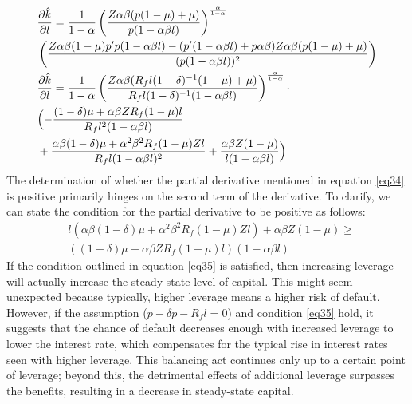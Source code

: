 \documentclass[12pt]{report}
\begin{document}
\begin{align}
    &\frac{\partial \hat{k}}{\partial l} = \frac{1}{1-\alpha} \left( \frac{Z\alpha\beta(p(1-\mu) + \mu)}{p(1-\alpha \beta l)} \right)^{\frac{\alpha}{1-\alpha}} \nonumber \\
    &\left( \frac{Z\alpha \beta (1-\mu)p^{\prime}p(1-\alpha \beta l) - (p^{\prime}(1-\alpha \beta l)+p \alpha \beta)Z\alpha\beta(p(1-\mu) + \mu)}{(p(1-\alpha \beta l))^2} \right)\nonumber \\
    &\frac{\partial \hat{k}}{\partial l} = \frac{1}{1-\alpha} \left( \frac{Z\alpha\beta(R_f l (1-\delta)^{-1}(1-\mu) + \mu)}{R_f l (1-\delta)^{-1}(1-\alpha \beta l)} \right)^{\frac{\alpha}{1-\alpha}} \cdot \nonumber \\
    & \Bigl( -\frac{(1-\delta)\mu +  \alpha \beta Z R_f (1-\mu) l}{R_f l^2 (1- \alpha \beta l)} \nonumber \\
    & +\frac{\alpha \beta (1-\delta)\mu + \alpha^2\beta^2 R_f(1-\mu)Z l}{R_f l (1- \alpha \beta l)^2} +\frac{\alpha \beta Z (1-\mu)}{ l (1- \alpha \beta l)} \Bigr) \label{eq34}
\end{align}
The determination of whether the partial derivative mentioned in equation \ref{eq34} is positive primarily hinges on the second term of the derivative. To clarify, we can state the condition for the partial derivative to be positive as follows:
\begin{align}
    &l (\alpha \beta (1-\delta)\mu + \alpha^2\beta^2 R_f(1-\mu)Z l) + \alpha \beta Z (1-\mu) \geq \nonumber\\
    &((1-\delta)\mu +  \alpha \beta Z R_f (1-\mu) l) (1- \alpha \beta l) \label{eq35}
\end{align}
If the condition outlined in equation \ref{eq35} is satisfied, then increasing leverage will actually increase the
steady-state level of capital. This might seem unexpected because typically, higher leverage means a higher risk of
default. However, if the assumption (\(p-\delta p - R_f l=0\)) and condition \ref{eq35} hold, it suggests that the chance of default decreases enough with increased
leverage to lower the interest rate, which compensates for the typical rise in interest rates seen with higher leverage.
This balancing act continues only up to a certain point of leverage; beyond this, the detrimental effects of additional
leverage surpasses the benefits, resulting in a decrease in steady-state capital. 
\end{document}
